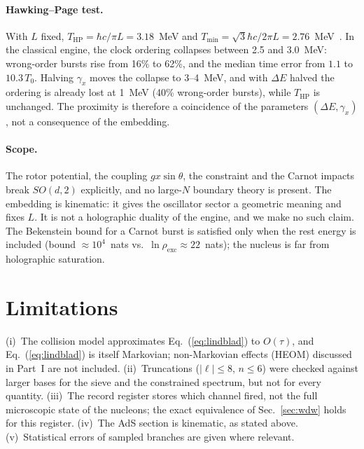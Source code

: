 \documentclass[aps,prc,twocolumn,superscriptaddress,amsmath,amssymb,nofootinbib]{revtex4-2}
\begin{document}
\paragraph*{Hawking--Page test.} With $L$ fixed, $T_{\text{HP}}=\hbar c/\pi L=3.18$~MeV and $T_{\min}=\sqrt3\hbar c/2\pi L=2.76$~MeV~\cite{HawkingPage1983,Witten1998}. In the classical engine, the clock ordering collapses between 2.5 and 3.0~MeV: wrong-order bursts rise from 16\% to 62\%, and the median time error from $1.1$ to $10.3\,T_0$. Halving $\gamma_x$ moves the collapse to 3--4~MeV, and with $\Delta E$ halved the ordering is already lost at 1~MeV (40\% wrong-order bursts), while $T_{\text{HP}}$ is unchanged. The proximity is therefore a coincidence of the parameters $(\Delta E,\gamma_x)$, not a consequence of the embedding.

\paragraph*{Scope.} The rotor potential, the coupling $gx\sin\theta$, the constraint and the Carnot impacts break $SO(d,2)$ explicitly, and no large-$N$ boundary theory is present. The embedding is kinematic: it gives the oscillator sector a geometric meaning and fixes $L$. It is not a holographic duality of the engine, and we make no such claim. The Bekenstein bound for a Carnot burst is satisfied only when the rest energy is included (bound $\approx10^4$~nats vs.\ $\ln\rho_{\text{exc}}\approx22$~nats); the nucleus is far from holographic saturation.

\section{Limitations}
(i)~The collision model approximates Eq.~(\ref{eq:lindblad}) to $O(\tau)$, and Eq.~(\ref{eq:lindblad}) is itself Markovian; non-Markovian effects (HEOM) discussed in Part~I are not included. (ii)~Truncations ($|\ell|\le8$, $n\le6$) were checked against larger bases for the sieve and the constrained spectrum, but not for every quantity. (iii)~The record register stores which channel fired, not the full microscopic state of the nucleons; the exact equivalence of Sec.~\ref{sec:wdw} holds for this register. (iv)~The AdS section is kinematic, as stated above. (v)~Statistical errors of sampled branches are given where relevant.

\end{document}
